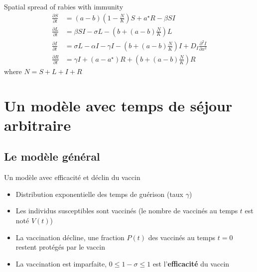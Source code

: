 \documentclass[aspectratio=169]{beamer}\usepackage[]{graphicx}\usepackage[]{xcolor}
\begin{document}
\nocite{murray1992spatial}

\begin{frame}{Spatial spread of rabies with immunity}
\begin{subequations}
\label{sys:rabies}
\begin{align}
\frac{\partial S}{\partial t} &= 
(a-b)\left(1-\frac NK\right)S+a^\star R-\beta SI \label{sys:rabies_S} \\
\frac{\partial L}{\partial t} &= 
\beta SI-\sigma L-\left(b+(a-b)\frac NK\right)L \label{sys:rabies_L} \\
\frac{\partial I}{\partial t} &= 
\sigma L-\alpha I-\gamma I-\left(b+(a-b)\frac NK\right)I 
+ D_I\frac{\partial^2 I}{\partial x^2} \label{sys:rabies_I} \\
\frac{\partial R}{\partial t} &= 
\gamma I+(a-a^\star)R+\left(b+(a-b)\frac NK\right)R \label{sys:rabies_R}
\end{align}
\end{subequations}
where $N=S+L+I+R$
\end{frame}

\section{Un modèle avec temps de séjour arbitraire}

\subsection{Le modèle général}

\nocite{ArinoCookeVdDVelasco2004}

\begin{frame}{Un modèle avec efficacité et déclin du vaccin}
\begin{itemize}
\item Distribution exponentielle des temps de guérison (taux $\gamma$)
\vfill
\item Les individus susceptibles sont vaccinés (le nombre de vaccinés au temps $t$ est noté $V(t)$)
\vfill
\item La vaccination décline, une fraction $P(t)$ des vaccinés au temps $t=0$ restent protégés par le vaccin
\vfill
\item La vaccination est imparfaite, $0\leq 1-\sigma\leq 1$ est l'\textbf{efficacité} du vaccin
\end{itemize}
\end{frame}
\end{document}
